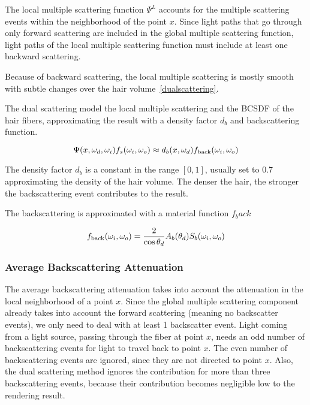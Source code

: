The local multiple scattering function $\Psi^L$ accounts for the multiple scattering events within the neighborhood of the point $x$. Since light paths that go through only forward scattering are included in the global multiple scattering function, light paths of the local multiple scattering function must include at least one backward scattering.

Because of backward scattering, the local multiple scattering is mostly smooth with subtle changes over the hair volume~\ref{dualscattering}.

The dual scattering model the local multiple scattering and the BCSDF of the hair fibers, approximating the result with a density factor $d_b$ and backscattering function.

\begin{equation}
\Psi(x, \omega_d, \omega_i) f_s(\omega_i, \omega_o) \approx d_b(x, \omega_d) f_{\textnormal{back}}(\omega_i, \omega_o)
\end{equation}

The density factor $d_b$ is a constant in the range $[0, 1]$, usually set to 0.7 approximating the density of the hair volume. The denser the hair, the stronger the backscattering event contributes to the result.

The backscattering is approximated with a material function $f_back$

\begin{equation}
f_{\textnormal{back}}(\omega_i, \omega_o) = \frac{2}{\cos \theta_d}A_b(\theta_d) S_b(\omega_i, \omega_o)
\end{equation}

\subsubsection{Average Backscattering Attenuation}

The average backscattering attenuation takes into account the attenuation in the local neighborhood of a point $x$. Since the global multiple scattering component already takes into account the forward scattering (meaning no backscatter events), we only need to deal with at least 1 backscatter event. Light coming from a light source, passing through the fiber at point $x$, needs an odd number of backscattering events for light to travel back to point $x$. The even number of backscattering events are ignored, since they are not directed to point $x$. Also, the dual scattering method ignores the contribution for more than three backscattering events, because their contribution becomes negligible low to the rendering result. 

